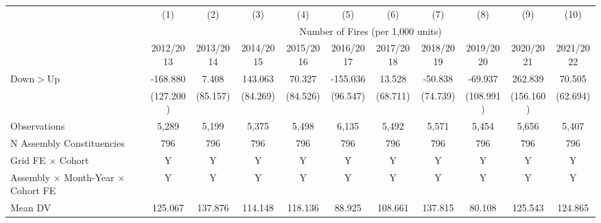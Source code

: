 \begin{tabular}{lcccccccccc} \hline
 & (1) & (2) & (3) & (4) & (5) & (6) & (7) & (8) & (9) & (10) \\
 & \multicolumn{10}{c}{Number of Fires (per 1,000 units)}\\
 & 2012/2013 & 2013/2014 & 2014/2015 & 2015/2016 & 2016/2017 & 2017/2018 & 2018/2019 & 2019/2020 & 2020/2021 & 2021/2022 \\ \hline

Down$>$Up   &    -168.880         &       7.408         &     143.063\sym{*}  &      70.327         &    -155.036         &      13.528         &     -50.838         &     -69.937         &     262.839\sym{*}  &      70.505         \\
            &   (127.200)         &    (85.157)         &    (84.269)         &    (84.526)         &    (96.547)         &    (68.711)         &    (74.739)         &   (108.991)         &   (156.160)         &    (62.694)         \\
\hline
Observations&       5,289         &       5,199         &       5,375         &       5,498         &       6,135         &       5,492         &       5,571         &       5,454         &       5,656         &       5,407         \\
N Assembly Constituencies&         796         &         796         &         796         &         796         &         796         &         796         &         796         &         796         &         796         &         796         \\
Grid FE $\times$ Cohort&           Y         &           Y         &           Y         &           Y         &           Y         &           Y         &           Y         &           Y         &           Y         &           Y         \\
Assembly $\times$ Month-Year $\times$ Cohort FE&           Y         &           Y         &           Y         &           Y         &           Y         &           Y         &           Y         &           Y         &           Y         &           Y         \\
Mean DV     &     125.067         &     137.876         &     114.148         &     118.136         &      88.925         &     108.661         &     137.815         &      80.108         &     125.543         &     124.865         \\
\hline
\end{tabular}

